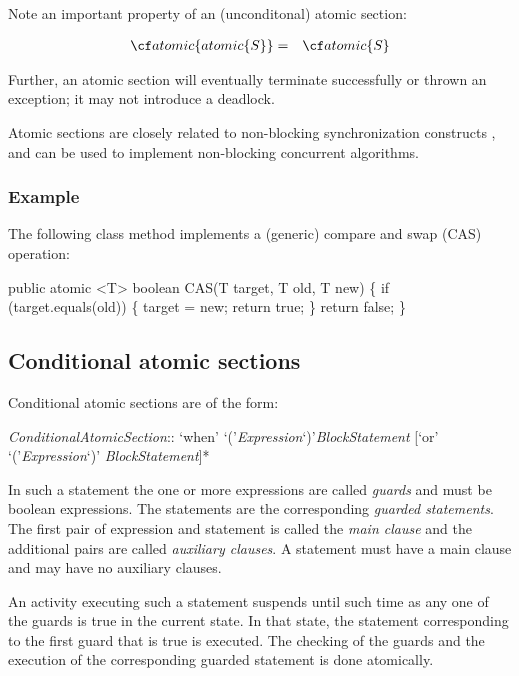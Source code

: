 {{Note an important property of an (unconditonal) atomic section:

\begin{eqnarray}
 {\cf atomic \{ atomic \{ S\}\}} &=& {\cf atomic \{S\}}
\end{eqnarray}

Further, an atomic section will eventually terminate successfully or
thrown an exception; it may not introduce a deadlock.

Atomic sections are closely related to non-blocking synchronization
constructs \cite{Herlihy-non-block}, and can be used to implement 
non-blocking concurrent algorithms.

\subsubsection{Example}

The following class method implements a (generic) compare and swap (CAS) operation:
\begin{x10}
  public atomic <T> boolean CAS(T target, T old, T new) \{
     if (target.equals(old)) \{
       target = new;
       return true;
     \}
     return false;
  \}
\end{x10}
\subsection{Conditional atomic sections}

Conditional atomic sections are of the form:
\begin{x10}
  {\cf\em{}ConditionalAtomicSection}::
    `when' `('{\cf\em{}Expression}`)'{\cf\em{}BlockStatement}
    [`or' `('{\cf\em{}Expression}`)' {\cf\em{}BlockStatement}]*
\end{x10}

In such a statement the one or more expressions are called {\em
guards} and must be {\cf boolean} expressions. The statements are the
corresponding {\em guarded statements}. The first pair of expression
and statement is called the {\em main clause} and the additional pairs
are called {\em auxiliary clauses}. A statement must have a main
clause and may have no auxiliary clauses.

An activity executing such a statement suspends until such time as any
one of the guards is true in the current state. In that state, the
statement corresponding to the first guard that is true is executed.
The checking of the guards and the execution of the corresponding
guarded statement is done atomically. 

}}
